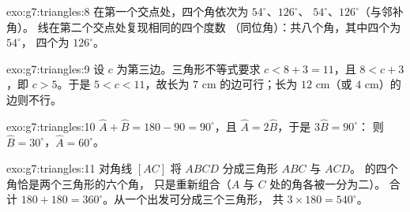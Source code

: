 \begin{solution}{exo:g7:triangles:8}
在第一个交点处，四个角依次为 $54^\circ$、$126^\circ$、
$54^\circ$、$126^\circ$（与邻补角）。
线在第二个交点处复现相同的四个度数
（同位角）：共八个角，其中四个为 $54^\circ$，
四个为 $126^\circ$。
\end{solution}

\begin{solution}{exo:g7:triangles:9}
设 $c$ 为第三边。三角形不等式要求
$c < 8 + 3 = 11$，且 $8 < c + 3$，即 $c > 5$。于是
$5 < c < 11$，故长为 $7$ cm 的边可行；长为 $12$ cm（或 $4$ cm）的
边则不行。
\end{solution}

\begin{solution}{exo:g7:triangles:10}
$\widehat A + \widehat B = 180 - 90 = 90^\circ$，且
$\widehat A = 2\widehat B$，于是 $3\widehat B = 90^\circ$：
则 $\widehat B = 30^\circ$，$\widehat A = 60^\circ$。
\end{solution}

\begin{solution}{exo:g7:triangles:11}
对角线 $[AC]$ 将 $ABCD$ 分成三角形 $ABC$ 与 $ACD$。
的四个角恰是两个三角形的六个角，
只是重新组合（$A$ 与 $C$ 处的角各被一分为二）。
合计 $180 + 180 = 360^\circ$。从一个出发可分成三个三角形，
共 $3 \times 180 = 540^\circ$。
\end{solution}


